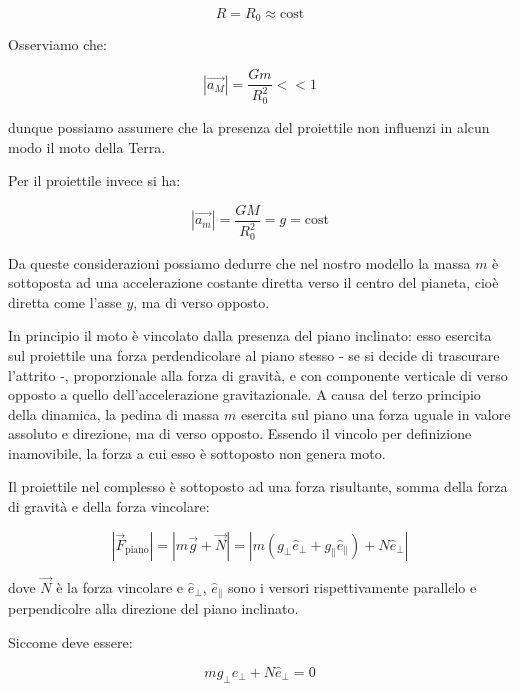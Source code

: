 \documentclass{article}
\begin{document}
\begin{equation}
R = R_0 \approx \mbox{cost}
\end{equation}

Osserviamo che:

\begin{equation}
|\vec{a_M}| = \frac{Gm}{R_0^2} << 1
\end{equation}

dunque possiamo assumere che la presenza del proiettile non influenzi in alcun
modo il moto della Terra.

Per il proiettile invece si ha:

\begin{equation}
|\vec{a_m}| = \frac{GM}{R_0^2} = g = \mbox{cost}
\end{equation}

Da queste considerazioni possiamo dedurre che nel nostro modello
la massa $m$ è sottoposta ad una accelerazione costante
diretta verso il centro del pianeta, cioè diretta come l'asse $y$,
ma di verso opposto.

In principio il moto è vincolato dalla presenza del piano inclinato:
esso esercita sul proiettile una forza perdendicolare al piano stesso
- se si decide di trascurare l'attrito -, proporzionale alla forza di
gravità, e con componente verticale di verso opposto a quello
dell'accelerazione gravitazionale. A causa del terzo principio della
dinamica, la pedina di massa $m$ esercita sul piano una forza uguale in
valore assoluto e direzione, ma di verso opposto. Essendo il vincolo
per definizione inamovibile, la forza a cui esso è sottoposto non genera
moto.

Il proiettile nel complesso è sottoposto ad una forza risultante, somma
della forza di gravità e della forza vincolare: 

\begin{equation}
|\vec{F}_\text{piano}| = |m\vec{g} + \vec{N}| = |m(g_\perp\hat{e}_\perp + g_\parallel\hat{e}_\parallel) + N\hat{e}_\perp|   
\end{equation}

dove $\vec{N}$ è la forza vincolare e $\hat{e}_\perp$, $\hat{e}_\parallel$
sono i versori rispettivamente parallelo e perpendicolre alla direzione del
piano inclinato.

Siccome deve essere:

\begin{equation}
mg_\perp\hat{e}_\perp + N\hat{e}_\perp = 0
\end{equation}
\end{document}
